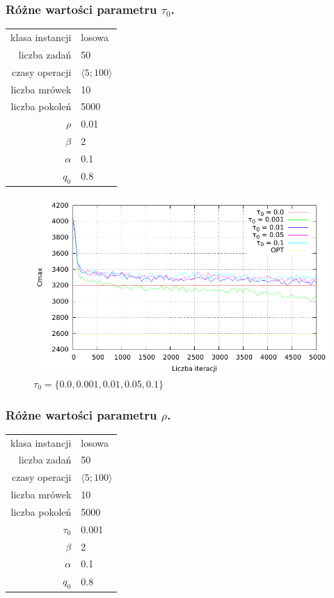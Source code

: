 \documentclass[10pt,a4paper]{article}
\begin{document}
\newpage
\subsubsection{Różne wartości parametru $\tau_0$.}
\vspace{6 mm}
\begin{center}
\begin{tabular}{|r|l|}
  \hline
  klasa instancji & losowa \\
  liczba zadań & 50 \\
  czasy operacji & $ \langle 5;100 \rangle $  \\
  liczba mrówek & 10 \\
  liczba pokoleń & 5000 \\
  $ \rho $ & 0.01 \\
  $ \beta $ & 2 \\
  $ \alpha $ & 0.1 \\
  $ q_0 $ & 0.8 \\
  \hline
\end{tabular}
\end{center}

\begin{figure}[h]
    \centering
    \includegraphics{./figures/inst_01_rnd_phinit_smooth.pdf}
    \caption{$ \tau_0 = \{ 0.0, 0.001, 0.01, 0.05, 0.1 \} $}
\end{figure}


\newpage
\subsubsection{Różne wartości parametru $\rho$.}
\vspace{6 mm}
\begin{center}
\begin{tabular}{|r|l|}
  \hline
  klasa instancji & losowa \\
  liczba zadań & 50 \\
  czasy operacji & $ \langle 5;100 \rangle $  \\
  liczba mrówek & 10 \\
  liczba pokoleń & 5000 \\
  $ \tau_0 $ & 0.001 \\
  $ \beta $ & 2 \\
  $ \alpha $ & 0.1 \\
  $ q_0 $ & 0.8 \\
  \hline
\end{tabular}
\end{center}
\end{document}
